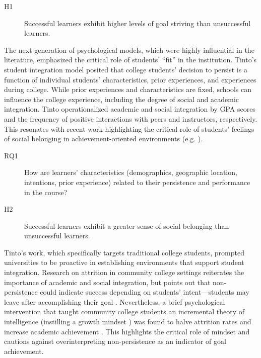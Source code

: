 \documentclass{sigchi}\usepackage[]{graphicx}\usepackage[]{color}
\begin{document}
\begin{description}
  \item[H1] Successful learners exhibit higher levels of goal striving than unsuccessful learners.
\end{description}

The next generation of psychological models, which were highly influential in the literature, emphasized the critical role of students' ``fit'' in the institution. Tinto's \citeyear{tinto1975dropout} student integration model posited that college students' decision to persist is a function of individual students' characteristics, prior experiences, and experiences during college. While prior experiences and characteristics are fixed, schools can influence the college experience, including the degree of social and academic integration. Tinto operationalized academic and social integration by GPA scores and the frequency of positive interactions with peers and instructors, respectively. This resonates with recent work highlighting the critical role of students' feelings of social belonging in achievement-oriented environments (e.g. \cite{walton2007question}). 

\begin{description}
  \item[RQ1] How are learners' characteristics (demographics, geographic location, intentions, prior experience) related to their persistence and performance in the course?
  \item[H2] Successful learners exhibit a greater sense of social belonging than unsuccessful learners.
\end{description}

Tinto's work, which specifically targets traditional college students, prompted universities to be proactive in establishing environments that support student integration. Research on attrition in community college settings reiterates the importance of academic and social integration, but points out that non-persistence could indicate success depending on students' intent---students may leave after accomplishing their goal \cite{bers1991persistence}. Nevertheless, a brief psychological intervention that taught community college students an incremental theory of intelligence (instilling a growth mindset \cite{dweck2006mindset}) was found to halve attrition rates and increase academic achievement \cite{paunesku2012brief}. This highlights the critical role of mindset and cautions against overinterpreting non-persistence as an indicator of goal achievement.
\end{document}
